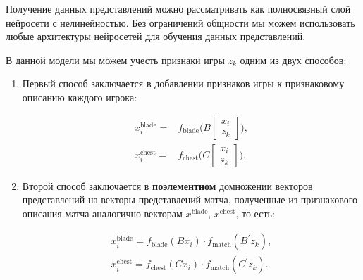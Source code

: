 \documentclass[12pt,a4paper]{article}
\begin{document}
Получение данных представлений можно рассматривать как полносвязный слой нейросети с нелинейностью. Без ограничений общности мы можем использовать любые архитектуры нейросетей для обучения данных представлений.

В данной модели мы можем учесть признаки игры $z_k$ одним из двух способов:
\begin{enumerate}
	\item Первый способ заключается в добавлении признаков игры к признаковому описанию каждого игрока:
	
	\begin{align*}
		x_i^{\text{blade}} = & f_{\text{blade}}\bigg(B \begin{bmatrix} x_i\\ z_k \end{bmatrix}\bigg),\\
		x_i^{\text{chest}} = & f_{\text{chest}}\bigg(C \begin{bmatrix} x_i\\ z_k \end{bmatrix}\bigg).
	\end{align*}
	\item Второй способ заключается в \textbf{поэлементном} домножении векторов представлений на векторы представлений матча, полученные из признакового описания матча аналогично векторам $x^{\text{blade}}, \, x^{\text{chest}}$, то есть:
	
	\begin{align*}
		x_i^{\text{blade}} = f_{\text{blade}}(B x_i) \cdot f_{\text{match}}(B^\prime z_k),\\
		x_i^{\text{chest}} = f_{\text{chest}}(C x_i) \cdot f_{\text{match}}(C^\prime z_k).
	\end{align*}
	
\end{enumerate}
\end{document}
